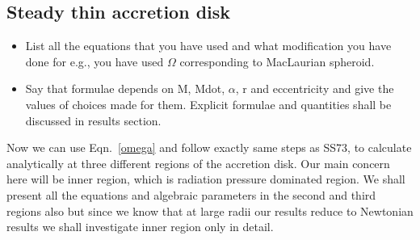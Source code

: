 \documentclass[useAMS,usenatbib]{mn2e}
\begin{document}
\subsection{Steady thin accretion disk}
\begin{itemize}
\item List all the equations that you have used and what modification
  you have done for e.g., you have used $\Omega$ corresponding to
  MacLaurian spheroid. 
\item Say that formulae depends on M, Mdot, $\alpha$, r and
  eccentricity and give the values of choices made for them. 
  Explicit formulae and quantities shall be discussed in results
  section.
\end{itemize}
Now we can use Eqn.~\ref{omega} and follow exactly same steps as SS73, to calculate analytically at three different regions of the accretion disk. Our main concern here will be inner region, which is radiation pressure dominated region. We shall present all the equations and algebraic parameters in the second and third regions also but since we know that at large radii our results reduce to Newtonian results we shall investigate inner region only in detail.
\end{document}
